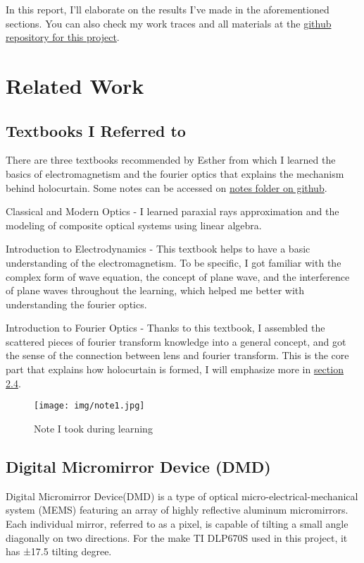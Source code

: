 \documentclass[10pt,journal,compsoc]{IEEEtran}
\begin{document}
In this report, I'll elaborate on the results I've made in the aforementioned sections. You can also check my work traces and all materials at the \href{https://github.com/zhuyuezx/CSC494_holoprojector/tree/main}{github repository for this project}.

\section{Related Work}
\label{sec:Related Work}

\subsection{Textbooks I Referred to}
\label{sec:2.1}
There are three textbooks recommended by Esther from which I learned the basics of electromagnetism and the fourier optics that explains the mechanism behind holocurtain. Some notes can be accessed on \href{https://github.com/zhuyuezx/CSC494_holoprojector/tree/main/Notes}{notes folder on github}.

Classical and Modern Optics\cite{ray optics} - I learned paraxial rays approximation and the modeling of composite optical systems using linear algebra.

Introduction to Electrodynamics\cite{electrodynamics} - This textbook helps to have a basic understanding of the electromagnetism. To be specific, I got familiar with the complex form of wave equation, the concept of plane wave, and the interference of plane waves throughout the learning, which helped me better with understanding the fourier optics.

Introduction to Fourier Optics\cite{fourier optics} - Thanks to this textbook, I assembled the scattered pieces of fourier transform knowledge into a general concept, and got the sense of the connection between lens and fourier transform. This is the core part that explains how holocurtain is formed, I will emphasize more in \hyperref[sec:2.4]{section 2.4}.
\begin{figure}[!h]
    \centering
    \texttt{[image: img/note1.jpg]}
    \caption{Note I took during learning}
\end{figure}

\subsection{Digital Micromirror Device (DMD)}
\label{sec:2.2}
 Digital Micromirror Device\cite{DMD}(DMD) is a type of optical micro-electrical-mechanical system (MEMS) featuring an array of highly reflective aluminum micromirrors. Each individual mirror, referred to as a pixel, is capable of tilting a small angle diagonally on two directions. For the make TI DLP670S used in this project, it has ±17.5 tilting degree.
\end{document}

